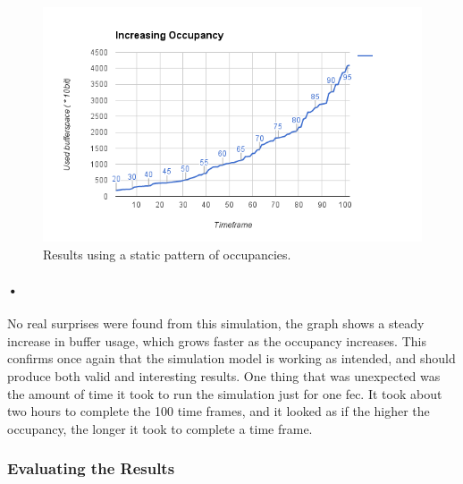 \documentclass[a4paper, 12pt, openright, twoside]{report}
\begin{document}
\begin{figure}[h!]
	\centering
		\includegraphics[width=1.0\textwidth]{images/increasing-occ.png}
		\caption{Results using a static pattern of occupancies.}
		\label{fig:increasing-occ}
\end{figure}

\paragraph{•} %
No real surprises were found from this simulation, the graph shows a steady increase in buffer usage, which grows faster as the occupancy increases.
This confirms once again that the simulation model is working as intended, and should produce both valid and interesting results.
One thing that was unexpected was the amount of time it took to run the simulation just for one \gls{fec}.
It took about two hours to complete the 100 time frames, and it looked as if the higher the occupancy, the longer it took to complete a time frame.

\subsubsection{Evaluating the Results}
\end{document}

